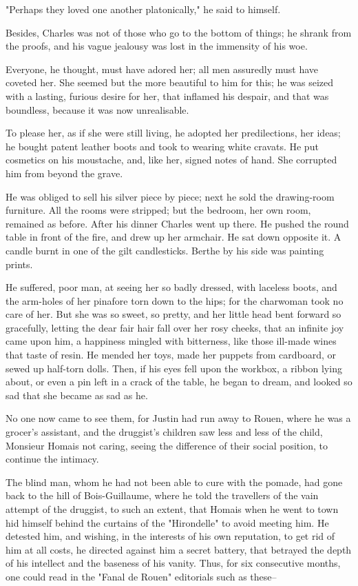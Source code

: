 \documentclass[11pt,twocolumn]{ltugboat}
\begin{document}
"Perhaps they loved one another platonically," he said to himself.

Besides, Charles was not of those who go to the bottom of things; he
shrank from the proofs, and his vague jealousy was lost in the immensity
of his woe.

Everyone, he thought, must have adored her; all men assuredly must have
coveted her. She seemed but the more beautiful to him for this; he
was seized with a lasting, furious desire for her, that inflamed his
despair, and that was boundless, because it was now unrealisable.

To please her, as if she were still living, he adopted her
predilections, her ideas; he bought patent leather boots and took to
wearing white cravats. He put cosmetics on his moustache, and, like her,
signed notes of hand. She corrupted him from beyond the grave.

He was obliged to sell his silver piece by piece; next he sold the
drawing-room furniture. All the rooms were stripped; but the bedroom,
her own room, remained as before. After his dinner Charles went up
there. He pushed the round table in front of the fire, and drew up her
armchair. He sat down opposite it. A candle burnt in one of the gilt
candlesticks. Berthe by his side was painting prints.

He suffered, poor man, at seeing her so badly dressed, with laceless
boots, and the arm-holes of her pinafore torn down to the hips; for the
charwoman took no care of her. But she was so sweet, so pretty, and her
little head bent forward so gracefully, letting the dear fair hair fall
over her rosy cheeks, that an infinite joy came upon him, a happiness
mingled with bitterness, like those ill-made wines that taste of
resin. He mended her toys, made her puppets from cardboard, or sewed up
half-torn dolls. Then, if his eyes fell upon the workbox, a ribbon lying
about, or even a pin left in a crack of the table, he began to dream,
and looked so sad that she became as sad as he.

No one now came to see them, for Justin had run away to Rouen, where he
was a grocer's assistant, and the druggist's children saw less and less
of the child, Monsieur Homais not caring, seeing the difference of their
social position, to continue the intimacy.

The blind man, whom he had not been able to cure with the pomade, had
gone back to the hill of Bois-Guillaume, where he told the travellers of
the vain attempt of the druggist, to such an extent, that Homais when
he went to town hid himself behind the curtains of the "Hirondelle" to
avoid meeting him. He detested him, and wishing, in the interests of his
own reputation, to get rid of him at all costs, he directed against
him a secret battery, that betrayed the depth of his intellect and the
baseness of his vanity. Thus, for six consecutive months, one could read
in the "Fanal de Rouen" editorials such as these--
\end{document}
